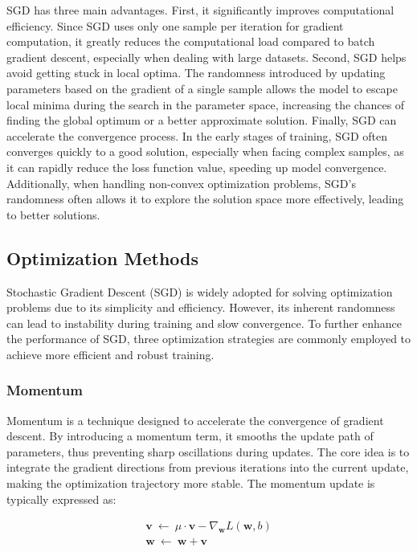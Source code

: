 \documentclass[a4paper, utf8]{ctexart}
\begin{document}
	SGD has three main advantages. First, it significantly improves computational efficiency. Since SGD uses only one sample per iteration for gradient computation, it greatly reduces the computational load compared to batch gradient descent, especially when dealing with large datasets. Second, SGD helps avoid getting stuck in local optima. The randomness introduced by updating parameters based on the gradient of a single sample allows the model to escape local minima during the search in the parameter space, increasing the chances of finding the global optimum or a better approximate solution. Finally, SGD can accelerate the convergence process. In the early stages of training, SGD often converges quickly to a good solution, especially when facing complex samples, as it can rapidly reduce the loss function value, speeding up model convergence. Additionally, when handling non-convex optimization problems, SGD's randomness often allows it to explore the solution space more effectively, leading to better solutions.
	
	\subsection{Optimization Methods}
	
	Stochastic Gradient Descent (SGD) is widely adopted for solving optimization problems due to its simplicity and efficiency. However, its inherent randomness can lead to instability during training and slow convergence. To further enhance the performance of SGD, three optimization strategies are commonly employed to achieve more efficient and robust training.
	
	\subsubsection{Momentum}
	
	Momentum is a technique designed to accelerate the convergence of gradient descent. By introducing a momentum term, it smooths the update path of parameters, thus preventing sharp oscillations during updates. The core idea is to integrate the gradient directions from previous iterations into the current update, making the optimization trajectory more stable. The momentum update is typically expressed as:
	
	\vspace{-1.25em}
	\begin{gather}
		\boldsymbol{v} \ \leftarrow \ \mu \cdot \boldsymbol{v} - \nabla_{\boldsymbol{w}}L(\boldsymbol{w}, b) \\
		\boldsymbol{w} \ \leftarrow \ \boldsymbol{w} + \boldsymbol{v}
	\end{gather}
	
\end{document}

